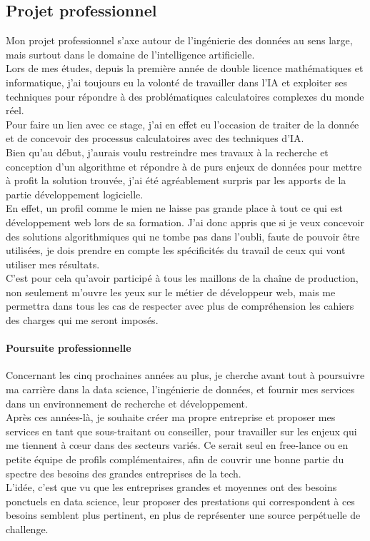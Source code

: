\documentclass{rapportCS}
\begin{document}
\subsection{Projet professionnel}

Mon projet professionnel s'axe autour de l'ingénierie des données au sens large, mais surtout
dans le domaine de l'intelligence artificielle.\\
Lors de mes études, depuis la première année de double licence mathématiques et informatique,
j'ai toujours eu la volonté de travailler dans l'IA et exploiter ses techniques pour répondre
à des problématiques calculatoires complexes du monde réel.\\

Pour faire un lien avec ce stage, j'ai en effet eu l'occasion de traiter de la donnée et de
concevoir des processus calculatoires avec des techniques d'IA.\\
Bien qu'au début, j'aurais voulu restreindre mes travaux à la recherche et conception
d'un algorithme et répondre à de purs enjeux de données pour mettre à profit
la solution trouvée, j'ai été agréablement surpris par les apports de la 
partie développement logicielle.\\
En effet, un profil comme le mien ne laisse pas grande place à tout ce qui est développement
web lors de sa formation. J'ai donc appris que si je veux concevoir des
solutions algorithmiques qui ne tombe pas dans l'oubli,
faute de pouvoir être utilisées, je dois prendre en compte les spécificités
du travail de ceux qui vont utiliser mes résultats.\\
C'est pour cela qu'avoir participé à tous les maillons de la chaîne de production, non seulement
m'ouvre les yeux sur le métier de développeur web, mais me permettra dans tous les cas
de respecter avec plus de compréhension les cahiers des charges qui me seront imposés.\\

\paragraph{Poursuite professionnelle}
Concernant les cinq prochaines années au plus, 
je cherche avant tout à poursuivre ma carrière dans la data science, l'ingénierie de données,
et fournir mes services dans un environnement de recherche et développement.\\

Après ces années-là, je souhaite créer ma propre entreprise et proposer mes services
en tant que sous-traitant ou conseiller, pour travailler sur les enjeux qui me tiennent à cœur
dans des secteurs variés. Ce serait seul en free-lance ou en petite équipe de profils complémentaires,
afin de couvrir une bonne partie du spectre des besoins des grandes entreprises de la tech.\\
L'idée, c'est que vu que les entreprises grandes et moyennes ont des besoins ponctuels
en data science, leur proposer des prestations qui correspondent à ces besoins
semblent plus pertinent, en plus de représenter une source perpétuelle de challenge.\\ 
\end{document}
